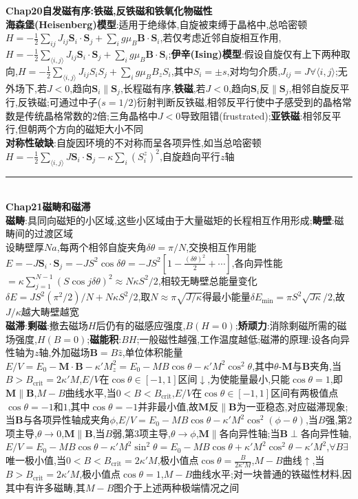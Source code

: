\documentclass[UTF8,10pt,a4paper]{article}
\begin{document}
\begin{multicols}{2}
\textbf{Chap20自发磁有序:铁磁,反铁磁和铁氧化物磁性}\\
\textbf{海森堡(Heisenberg)模型}:适用于绝缘体,自旋被束缚于晶格中,总哈密顿$H=-\frac{1}{2}\sum_{ij}J_{ij}\bm{S}_i\cdot\bm{S}_j+\sum_ig\mu_B\bm{B}\cdot\bm{S}_i$,若仅考虑近邻自旋相互作用,$H=-\frac{1}{2}\sum_{\langle i,j\rangle}J_{ij}\bm{S}_i\cdot\bm{S}_j+\sum_ig\mu_B\bm{B}\cdot\bm{S}_i$;\textbf{伊辛(Ising)模型}:假设自旋仅有上下两种取向,$H=-\frac{1}{2}\sum_{\langle i,j\rangle}J_{ij}S_iS_j+\sum_ig\mu_BB_zS_i$,其中$S_i=\pm s$,对均匀介质,$J_{ij}=J\forall\langle i,j\rangle$;无外场下,若$J<0$,趋向$\bm{S}_i\parallel\bm{S}_j$,长程磁有序,\textbf{铁磁},若$J<0$,趋向$\bm{S}_i$反$\parallel\bm{S}_j$,相邻自旋反平行,反铁磁;可通过中子($s=1/2$)衍射判断反铁磁,相邻反平行使中子感受到的晶格常数是传统晶格常数的$2$倍;三角晶格中$J<0$导致阻错(frustrated);\textbf{亚铁磁}:相邻反平行,但朝两个方向的磁矩大小不同\\
\textbf{对称性破缺}:自旋因环境的不对称而呈各项异性,如当总哈密顿$H=-\frac{1}{2}\sum_{\langle i,j\rangle}J\bm{S}_i\cdot\bm{S}_j-\kappa\sum_i(S_i^z)^2$,自旋趋向平行$z$轴\\
\rule{\columnwidth}{.2pt}\\
\textbf{Chap21磁畴和磁滞}\\
\textbf{磁畴}:具同向磁矩的小区域,这些小区域由于大量磁矩的长程相互作用形成;\textbf{畴壁}:磁畴间的过渡区域\\
设畴壁厚$Na$,每两个相邻自旋夹角$\delta\theta=\pi/N$,交换相互作用能$E=-J\bm{S}_i\cdot\bm{S}_j=-JS^2\cos\delta\theta=-JS^2[1-\frac{(\delta\theta)^2}{2}+\cdots]$,各向异性能$=\kappa\sum_{j=1}^{N-1}(S\cos j\delta\theta)^2\approx N\kappa S^2/2$,相较无畴壁总能量变化$\delta E=JS^2(\pi^2/2)/N+N\kappa S^2/2$,取$N\approx\pi\sqrt{J/\kappa}$得最小能量$\delta E_{\min}=\pi S^2\sqrt{J\kappa}/2$,故$J/\kappa$越大畴壁越宽\\
\textbf{磁滞}:\textbf{剩磁}:撤去磁场$H$后仍有的磁感应强度,$B(H=0)$;\textbf{矫顽力}:消除剩磁所需的磁场强度,$H(B=0)$;\textbf{磁能积}:$BH$;一般磁性越强,工作温度越低;磁滞的原理:设各向异性轴为$z$轴,外加磁场$\bm{B}=B\hat{z}$,单位体积能量$E/V=E_0-\bm{M}\cdot\bm{B}-\kappa'M_z^2=E_0-MB\cos\theta-\kappa'M^2\cos^2\theta$,其中$\theta$-$\bm{M}$与$\bm{B}$夹角,当$B>B_{\text{crit}}=2\kappa'M$,$E/V$在$\cos\theta\in[-1,1]$区间$\downarrow$,为使能量最小,只能$\cos\theta=1$,即$\bm{M}\parallel\bm{B}$,$M-B$曲线水平,当$0<B<B_{\text{crit}}$,$E/V$在$\cos\theta\in[-1,1]$区间有两极值点$\cos\theta=-1$和$1$,其中$\cos\theta=-1$并非最小值,故$\bm{M}$反$\parallel\bm{B}$为一亚稳态,对应磁滞现象;当$\bm{B}$与各项异性轴成夹角$\phi$,$E/V=E_0-MB\cos\theta-\kappa'M^2\cos^2(\phi-\theta)$,当$B$强,第$2$项主导,$\theta\rightarrow 0$,$\bm{M}\parallel\bm{B}$,当$B$弱,第$3$项主导,$\theta\rightarrow\phi$,$\bm{M}\parallel$各向异性轴;当$\bm{B}\perp$各向异性轴,$E/V=E_0-MB\cos\theta-\kappa'M^2\sin^2\theta=E_0-MB\cos\theta+\kappa'M^2\cos^2\theta-\kappa'M^2$,$\forall B\exists$唯一极小值,当$0<B<B_{\text{crit}}=2\kappa'M$,极小值点$\cos\theta=\frac{B}{2\kappa'M}$,$M-B$曲线$\uparrow$,当$B>B_{\text{crit}}=2\kappa'M$,极小值点$\cos\theta=1$,$M-B$曲线水平;对一块普通的铁磁性材料,因其中有许多磁畴,其$M-B$图介于上述两种极端情况之间\\

\end{multicols}
\end{document}

